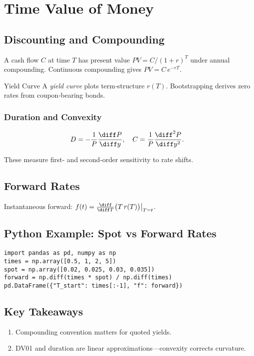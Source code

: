 \chapter{Time Value of Money}\label{ch:timevalue}

\section{Discounting and Compounding}

A cash flow \(C\) at time \(T\) has present value
\(PV = C/(1+r)^T\) under annual compounding.
Continuous compounding gives \(PV = C\,e^{-rT}\).

\begin{definition}{Yield Curve}{}
A \emph{yield curve} plots term‑structure \(r(T)\).
Bootstrapping derives zero rates from coupon‑bearing bonds.
\end{definition}

\subsection{Duration and Convexity}
\[
D = -\frac{1}{P}\frac{\diff P}{\diff y},\quad
C = \frac{1}{P}\frac{\diff^2 P}{\diff y^2}.
\]

These measure first‑ and second‑order sensitivity to rate shifts.

\section{Forward Rates}
Instantaneous forward:
\(f(t) = \frac{\diff}{\diff T}\bigl(T \, r(T)\bigr)\big|_{T=t}\).

\section*{Python Example: Spot vs Forward Rates}
\begin{verbatim}
import pandas as pd, numpy as np
times = np.array([0.5, 1, 2, 5])
spot = np.array([0.02, 0.025, 0.03, 0.035])
forward = np.diff(times * spot) / np.diff(times)
pd.DataFrame({"T_start": times[:-1], "f": forward})
\end{verbatim}

\section*{Key Takeaways}
\begin{enumerate}
  \item Compounding convention matters for quoted yields.
  \item DV01 and duration are linear approximations—convexity corrects curvature.
\end{enumerate}
